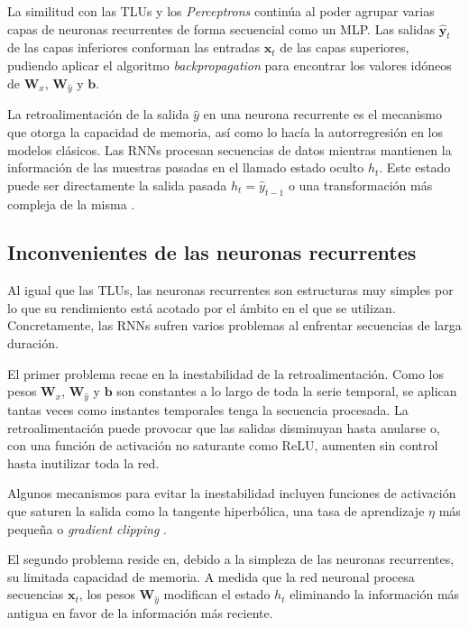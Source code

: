 La similitud con las TLUs y los \textit{Perceptrons} continúa al poder agrupar varias capas de neuronas recurrentes de forma secuencial como un MLP. Las salidas $\hat{\textbf{y}}_t$ de las capas inferiores conforman las entradas $\textbf{x}_t$ de las capas superiores, pudiendo aplicar el algoritmo \textit{backpropagation} para encontrar los valores idóneos de $\textbf{W}_x$, $\textbf{W}_{\hat{y}}$ y $\textbf{b}$.

La retroalimentación de la salida $\hat{y}$ en una neurona recurrente es el mecanismo que otorga la capacidad de memoria, así como lo hacía la autorregresión en los modelos clásicos. Las RNNs procesan secuencias de datos mientras mantienen la información de las muestras pasadas en el llamado estado oculto $h_t$. Este estado puede ser directamente la salida pasada $h_t=\hat{y}_{t-1}$ o una transformación más compleja de la misma \cite{machinelearningbook}.





\subsection{Inconvenientes de las neuronas recurrentes}
Al igual que las TLUs, las neuronas recurrentes son estructuras muy simples por lo que su rendimiento está acotado por el ámbito en el que se utilizan. Concretamente, las RNNs sufren varios problemas al enfrentar secuencias de larga duración.

El primer problema recae en la inestabilidad de la retroalimentación. Como los pesos $\textbf{W}_x$, $\textbf{W}_{\hat{y}}$ y $\textbf{b}$ son constantes a lo largo de toda la serie temporal, se aplican tantas veces como instantes temporales tenga la secuencia procesada. La retroalimentación puede provocar que las salidas disminuyan hasta anularse o, con una función de activación no saturante como ReLU, aumenten sin control hasta inutilizar toda la red.

Algunos mecanismos para evitar la inestabilidad incluyen funciones de activación que saturen la salida como la tangente hiperbólica, una tasa de aprendizaje $\eta$ más pequeña o \textit{gradient clipping} \cite{machinelearningbook}.

El segundo problema reside en, debido a la simpleza de las neuronas recurrentes, su limitada capacidad de memoria. A medida que la red neuronal procesa secuencias $\textbf{x}_t$, los pesos $\textbf{W}_{\hat{y}}$ modifican el estado $h_t$ eliminando la información más antigua en favor de la información más reciente.

